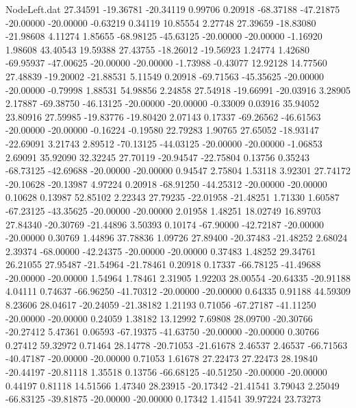 \begin{filecontents}{NodeLeft.dat}
  27.34591  -19.36781  -20.34119     0.99706    0.20918  -68.37188  -47.21875  -20.00000  -20.00000   -0.63219    0.34119   10.85554    2.27748
  27.39659  -18.83080  -21.98608     4.11274    1.85655  -68.98125  -45.63125  -20.00000  -20.00000   -1.16920    1.98608   43.40543   19.59388
  27.43755  -18.26012  -19.56923     1.24774    1.42680  -69.95937  -47.00625  -20.00000  -20.00000   -1.73988   -0.43077   12.92128   14.77560
  27.48839  -19.20002  -21.88531     5.11549    0.20918  -69.71563  -45.35625  -20.00000  -20.00000   -0.79998    1.88531   54.98856    2.24858
  27.54918  -19.66991  -20.03916     3.28905    2.17887  -69.38750  -46.13125  -20.00000  -20.00000   -0.33009    0.03916   35.94052   23.80916
  27.59985  -19.83776  -19.80420     2.07143    0.17337  -69.26562  -46.61563  -20.00000  -20.00000   -0.16224   -0.19580   22.79283    1.90765
  27.65052  -18.93147  -22.69091     3.21743    2.89512  -70.13125  -44.03125  -20.00000  -20.00000   -1.06853    2.69091   35.92090   32.32245
  27.70119  -20.94547  -22.75804     0.13756    0.35243  -68.73125  -42.69688  -20.00000  -20.00000    0.94547    2.75804    1.53118    3.92301
  27.74172  -20.10628  -20.13987     4.97224    0.20918  -68.91250  -44.25312  -20.00000  -20.00000    0.10628    0.13987   52.85102    2.22343
  27.79235  -22.01958  -21.48251     1.71330    1.60587  -67.23125  -43.35625  -20.00000  -20.00000    2.01958    1.48251   18.02749   16.89703
  27.84340  -20.30769  -21.44896     3.50393    0.10174  -67.90000  -42.72187  -20.00000  -20.00000    0.30769    1.44896   37.78836    1.09726
  27.89400  -20.37483  -21.48252     2.68024    2.39374  -68.00000  -42.24375  -20.00000  -20.00000    0.37483    1.48252   29.34761   26.21055
  27.95487  -21.54964  -21.78461     0.20918    0.17337  -66.78125  -41.49688  -20.00000  -20.00000    1.54964    1.78461    2.31905    1.92203
  28.00554  -20.64335  -20.91188     4.04111    0.74637  -66.96250  -41.70312  -20.00000  -20.00000    0.64335    0.91188   44.59309    8.23606
  28.04617  -20.24059  -21.38182     1.21193    0.71056  -67.27187  -41.11250  -20.00000  -20.00000    0.24059    1.38182   13.12992    7.69808
  28.09700  -20.30766  -20.27412     5.47361    0.06593  -67.19375  -41.63750  -20.00000  -20.00000    0.30766    0.27412   59.32972    0.71464
  28.14778  -20.71053  -21.61678     2.46537    2.46537  -66.71563  -40.47187  -20.00000  -20.00000    0.71053    1.61678   27.22473   27.22473
  28.19840  -20.44197  -20.81118     1.35518    0.13756  -66.68125  -40.51250  -20.00000  -20.00000    0.44197    0.81118   14.51566    1.47340
  28.23915  -20.17342  -21.41541     3.79043    2.25049  -66.83125  -39.81875  -20.00000  -20.00000    0.17342    1.41541   39.97224   23.73273

\end{filecontents}
